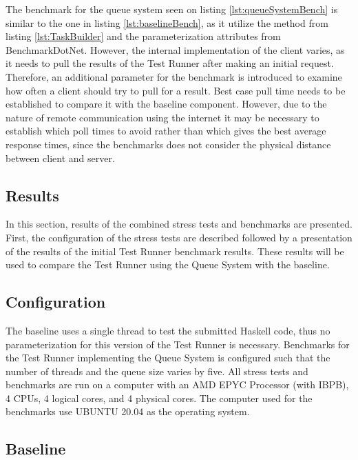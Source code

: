 The benchmark for the queue system seen on listing \ref{lst:queueSystemBench} is similar to the one in listing \ref{lst:baselineBench}, as it utilize the method from listing \ref{lst:TaskBuilder} and the parameterization attributes from BenchmarkDotNet. However, the internal implementation of the client varies, as it needs to pull the results of the Test Runner after making an initial request.
Therefore, an additional parameter for the benchmark is introduced to examine how often a client should try to pull for a result.
Best case pull time needs to be established to compare it with the baseline component. 
However, due to the nature of remote communication using the internet it may be necessary to establish which poll times to avoid rather than which gives the best average response times, since the benchmarks does not consider the physical distance between client and server.

\subsection{Results}
In this section, results of the combined stress tests and benchmarks are presented.
First, the configuration of the stress tests are described followed by a presentation of the results of the initial Test Runner benchmark results. These results will be used to compare the Test Runner using the Queue System with the baseline.  

\subsection{Configuration}
The baseline uses a single thread to test the submitted Haskell code, thus no parameterization for this version of the Test Runner is necessary.
Benchmarks for the Test Runner implementing the Queue System is configured such that the number of threads and the queue size varies by five. 
All stress tests and benchmarks are run on a computer with an AMD EPYC Processor (with IBPB), 4 CPUs, 4 logical cores, and 4 physical cores. The computer used for the benchmarks use UBUNTU 20.04 as the operating system.

\subsection{Baseline}

